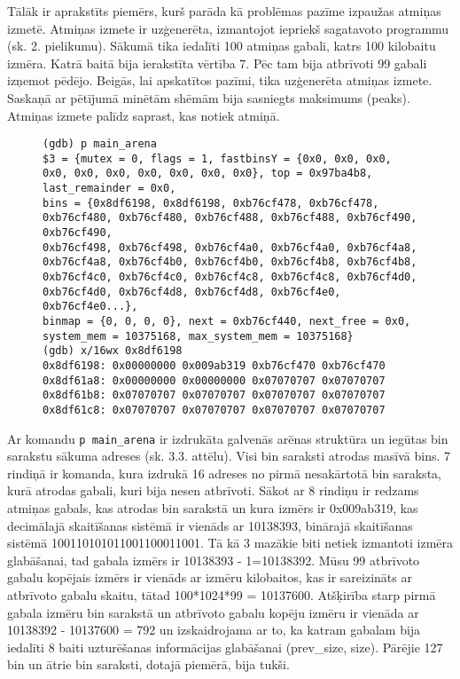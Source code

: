 Tālāk ir aprakstīts piemērs, kurš parāda kā problēmas pazīme izpaužas atmiņas izmetē.
Atmiņas izmete ir uzģenerēta, izmantojot iepriekš sagatavoto programmu (sk. 2. pielikumu).
Sākumā tika iedalīti 100 atmiņas gabali, katrs 100 kilobaitu izmēra.
Katrā baitā bija ierakstīta vērtība 7.
Pēc tam bija atbrīvoti 99 gabali izņemot pēdējo.
Beigās, lai apskatītos pazīmi, tika uzģenerēta atmiņas izmete.
Saskaņā ar pētījumā minētām shēmām \cite{PWMS}  bija sasniegts maksimums (peaks).
Atmiņas izmete palīdz saprast, kas notiek atmiņā.
\begin{figure}[h]
\begin{lstlisting}[style=customgdb]
(gdb) p main_arena
$3 = {mutex = 0, flags = 1, fastbinsY = {0x0, 0x0, 0x0, 0x0, 0x0, 0x0, 0x0, 0x0, 0x0, 0x0}, top = 0x97ba4b8, last_remainder = 0x0,
bins = {0x8df6198, 0x8df6198, 0xb76cf478, 0xb76cf478, 0xb76cf480, 0xb76cf480, 0xb76cf488, 0xb76cf488, 0xb76cf490, 0xb76cf490,
0xb76cf498, 0xb76cf498, 0xb76cf4a0, 0xb76cf4a0, 0xb76cf4a8, 0xb76cf4a8, 0xb76cf4b0, 0xb76cf4b0, 0xb76cf4b8, 0xb76cf4b8,
0xb76cf4c0, 0xb76cf4c0, 0xb76cf4c8, 0xb76cf4c8, 0xb76cf4d0, 0xb76cf4d0, 0xb76cf4d8, 0xb76cf4d8, 0xb76cf4e0, 0xb76cf4e0...},
binmap = {0, 0, 0, 0}, next = 0xb76cf440, next_free = 0x0, system_mem = 10375168, max_system_mem = 10375168}
(gdb) x/16wx 0x8df6198
0x8df6198: 0x00000000 0x009ab319 0xb76cf470 0xb76cf470
0x8df61a8: 0x00000000 0x00000000 0x07070707 0x07070707
0x8df61b8: 0x07070707 0x07070707 0x07070707 0x07070707
0x8df61c8: 0x07070707 0x07070707 0x07070707 0x07070707
\end{lstlisting}
\caption{\textbf{\fontsize{11}{12}\selectfont {bin saraksta izdruka, izmantojot atmiņas izmeti}}}
\end{figure}
Ar komandu \texttt{p main\_arena} ir izdrukāta galvenās arēnas struktūra un iegūtas bin sarakstu sākuma adreses (sk. 3.3. attēlu).
Visi bin saraksti atrodas masīvā bins.
7 rindiņā ir komanda, kura izdrukā 16 adreses no pirmā nesakārtotā bin saraksta, kurā atrodas gabali, kuri bija nesen atbrīvoti.
Sākot ar 8 rindiņu ir redzams atmiņas gabals, kas atrodas bin sarakstā un kura izmērs ir 0x009ab319, kas decimālajā skaitīšanas sistēmā ir vienāds ar 10138393, binārajā skaitīšanas sistēmā 100110101011001100011001.
Tā kā 3 mazākie biti netiek izmantoti izmēra glabāšanai, tad gabala izmērs ir 10138393 - 1=10138392.
Mūsu 99 atbrīvoto gabalu kopējais izmērs ir vienāds ar izmēru kilobaitos, kas ir sareizināts ar atbrīvoto gabalu skaitu, tātad 100*1024*99 = 10137600.
Atšķirība starp pirmā gabala izmēru bin sarakstā un atbrīvoto gabalu kopēju izmēru ir vienāda ar 10138392 - 10137600 = 792 un izskaidrojama ar to, ka katram gabalam bija iedalīti 8 baiti uzturēšanas informācijas glabāšanai (prev\_size, size).
Pārējie 127 bin un ātrie bin saraksti, dotajā piemērā, bija tukši.

